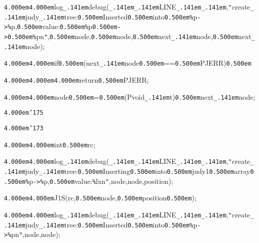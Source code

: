 \noindent
{}\hfill

\noindent
{}{\tt\mc \kern4.000em}{\tt\mc \kern4.000em}log{\tt\_\kern.141em}debug({\tt\_\kern.141em}{\tt\_\kern.141em}LINE{\tt\_\kern.141em}{\tt\_\kern.141em},{\tt "}create{\tt\_\kern.141em}judy{\tt\_\kern.141em}tree:{\tt\mc \kern0.500em}Inserted{\tt\mc \kern0.500em}into{\tt\mc \kern0.500em}{\tt\%}p{\tt -}{\tt >}{\tt\%}p,{\tt\mc \kern0.500em}value:{\tt\mc \kern0.500em}{\tt\%}p{\tt\mc \kern0.500em}{\tt -}{\tt >}{\tt\mc \kern0.500em}{\tt\%}p{\tt{}}n{\tt "},{\tt\mc \kern0.500em}node,{\tt\mc \kern0.500em}{\tt *}node,{\tt\mc \kern0.500em}next{\tt\_\kern.141em}node,{\tt\mc \kern0.500em}{\tt *}next{\tt\_\kern.141em}node);

\noindent
{}\hfill

\noindent
{}{\tt\mc \kern4.000em}{\tt\mc \kern4.000em}if{\tt\mc \kern0.500em}(next{\tt\_\kern.141em}node{\tt\mc \kern0.500em}=={\tt\mc \kern0.500em}PJERR){\tt\mc \kern0.500em}

\noindent
{}{\tt\mc \kern4.000em}{\tt\mc \kern4.000em}{\tt\mc \kern4.000em}return{\tt\mc \kern0.500em}PJERR;

\noindent
{}{\tt\mc \kern4.000em}{\tt\mc \kern4.000em}node{\tt\mc \kern0.500em}={\tt\mc \kern0.500em}(Pvoid{\tt\_\kern.141em}t{\tt *}){\tt\mc \kern0.500em}next{\tt\_\kern.141em}node;

\noindent
{}{\tt\mc \kern4.000em}{\tt\char'175}

\noindent
{}{\tt\mc \kern4.000em}{\tt\char'173}

\noindent
{}{\tt\mc \kern4.000em}{\tt\mc \kern4.000em}int{\tt\mc \kern0.500em}rc;

\noindent
{}\hfill

\noindent
{}{\tt\mc \kern4.000em}{\tt\mc \kern4.000em}log{\tt\_\kern.141em}debug({\tt\_\kern.141em}{\tt\_\kern.141em}LINE{\tt\_\kern.141em}{\tt\_\kern.141em},{\tt "}create{\tt\_\kern.141em}judy{\tt\_\kern.141em}tree:{\tt\mc \kern0.500em}Inserting{\tt\mc \kern0.500em}into{\tt\mc \kern0.500em}judy1{\tt\mc \kern0.500em}array{\tt\mc \kern0.500em}{\tt\%}p{\tt -}{\tt >}{\tt\%}p,{\tt\mc \kern0.500em}value:{\tt\%}lx{\tt{}}n{\tt "},node,{\tt *}node,position);

\noindent
{}\hfill

\noindent
{}{\tt\mc \kern4.000em}{\tt\mc \kern4.000em}J1S(rc,{\tt\mc \kern0.500em}{\tt *}node,{\tt\mc \kern0.500em}position{\tt\mc \kern0.500em});

\noindent
{}\hfill

\noindent
{}{\tt\mc \kern4.000em}{\tt\mc \kern4.000em}log{\tt\_\kern.141em}debug({\tt\_\kern.141em}{\tt\_\kern.141em}LINE{\tt\_\kern.141em}{\tt\_\kern.141em},{\tt "}create{\tt\_\kern.141em}judy{\tt\_\kern.141em}tree:{\tt\mc \kern0.500em}Inserted{\tt\mc \kern0.500em}into{\tt\mc \kern0.500em}{\tt\%}p{\tt -}{\tt >}{\tt\%}p{\tt{}}n{\tt "},node,{\tt *}node);

